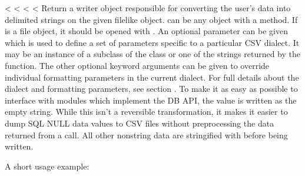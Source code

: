 \documentclass[letterpaper,10pt,english]{sphinxmanual}
\begin{document}
\vspace{5px}

\begin{fulllineitems}
\label{\detokenize{csv:csv.writer}}
<%
\pysigstartsignatures
<%
<%
<%
Return a writer object responsible for converting the user’s data into delimited
strings on the given file\sphinxhyphen{}like object.   can be any object with a
 method.  If  is a file object, it should be opened with
 \sphinxfootnotemark[1].  An optional 
parameter can be given which is used to define a set of parameters specific to a
particular CSV dialect.  It may be an instance of a subclass of the
{\hyperref[\detokenize{csv:csv.Dialect}]{}} class or one of the strings returned by the
{\hyperref[\detokenize{csv:csv.list_dialects}]{}} function.  The other optional  keyword arguments
can be given to override individual formatting parameters in the current
dialect.  For full details about the dialect and formatting parameters, see
section {\hyperref[\detokenize{csv:csv-fmt-params}]{}}. To make it
as easy as possible to interface with modules which implement the DB API, the
value  is written as the empty string.  While this isn’t a
reversible transformation, it makes it easier to dump SQL NULL data values to
CSV files without preprocessing the data returned from a  call.
All other non\sphinxhyphen{}string data are stringified with  before being written.

A short usage example:


\end{fulllineitems}
\end{document}
